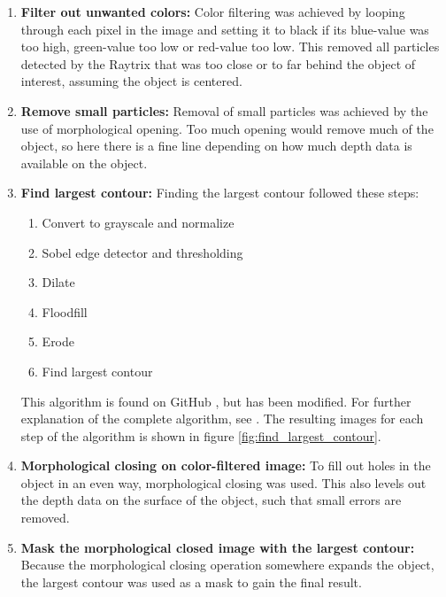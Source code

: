 \begin{enumerate}
    \item \textbf{Filter out unwanted colors:}
    Color filtering was achieved by looping through each pixel in the image and setting it to black if its blue-value was too high, green-value too low or red-value too low. This removed all particles detected by the Raytrix that was too close or to far behind the object of interest, assuming the object is centered.
    
    \item \textbf{Remove small particles:}
    Removal of small particles was achieved by the use of morphological opening. Too much opening would remove much of the object, so here there is a fine line depending on how much depth data is available on the object.
    
    \item \textbf{Find largest contour:} 
    Finding the largest contour followed these steps: 
    \begin{enumerate}[label*=\arabic*.]
        \item Convert to grayscale and normalize
        \item Sobel edge detector and thresholding
        \item Dilate
        \item Floodfill
        \item Erode
        \item Find largest contour
    \end{enumerate}
    This algorithm is found on GitHub \cite{website:largest_contour_code_github}, but has been modified. For further explanation of the complete algorithm, see \cite{website:largest_contour_code_explanation}.
    The resulting images for each step of the algorithm is shown in figure \ref{fig:find_largest_contour}.
    
    \item \textbf{Morphological closing on color-filtered image:}
    To fill out holes in the object in an even way, morphological closing was used. This also levels out the depth data on the surface of the object, such that small errors are removed.
    
    \item \textbf{Mask the morphological closed image with the largest contour:}
    Because the morphological closing operation somewhere expands the object, the largest contour was used as a mask to gain the final result. 
\end{enumerate}

